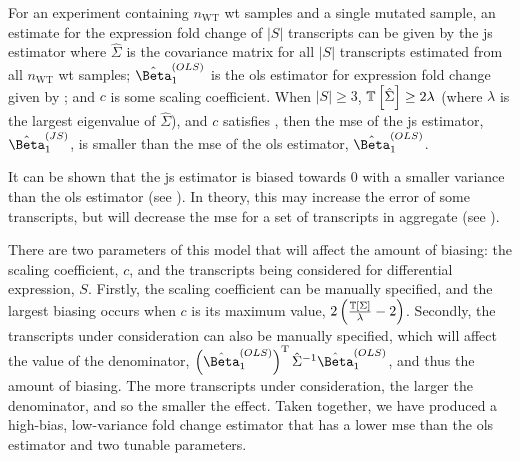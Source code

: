 \begin{theorem}
  For an experiment containing $n_\mathrm{WT}$ \gls{wt} samples and a single mutated sample, an estimate for the expression fold change of $|S|$ transcripts can be given by the \gls{js} estimator  where $\hat{\Sigma}$ is the covariance matrix for all $|S|$ transcripts estimated from all $n_\mathrm{WT}$ \gls{wt} samples; $\fcols$ is the \gls{ols} estimator for expression fold change given by ; and $c$ is some scaling coefficient.
  When $|S| \ge 3$, $\mathbb{T} \left[ \hat{\Sigma} \right] \ge 2\lambda$ (where $\lambda$ is the largest eigenvalue of $\hat{\Sigma}$), and $c$ satisfies , then the \gls{mse} of the \gls{js} estimator, $\fcjs$, is smaller than the \gls{mse} of the \gls{ols} estimator, $\fcols$.
\end{theorem}

It can be shown that the \gls{js} estimator is biased towards 0 with a smaller variance than the \gls{ols} estimator (see ).
In theory, this may increase the error of some transcripts, but will decrease the \gls{mse} for a set of transcripts in aggregate (see ).

There are two parameters of this model that will affect the amount of biasing: the scaling coefficient, $c$, and the transcripts being considered for differential expression, $S$.
Firstly, the scaling coefficient can be manually specified, and the largest biasing occurs when $c$ is its maximum value, $2 \left( \frac{\mathbb{T} \left[ \Sigma \right]}{\lambda} - 2 \right)$.
Secondly, the transcripts under consideration can also be manually specified, which will affect the value of the denominator, $\left( \fcols \right)^\tran \hat{\Sigma}^{-1} \fcols$, and thus the amount of biasing.
The more transcripts under consideration, the larger the denominator, and so the smaller the effect.
Taken together, we have produced a high-bias, low-variance fold change estimator that has a lower \gls{mse} than the \gls{ols} estimator and two tunable parameters.
